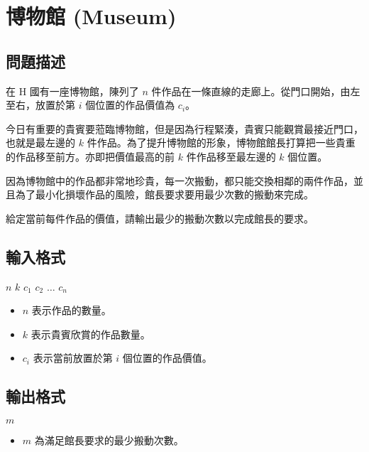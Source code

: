 \section{博物館 (Museum)}

\subsection{問題描述}

在 H 國有一座博物館，陳列了 \(n\)
件作品在一條直線的走廊上。從門口開始，由左至右，放置於第 \(i\)
個位置的作品價值為 \(c_i\)。

今日有重要的貴賓要蒞臨博物館，但是因為行程緊湊，貴賓只能觀賞最接近門口，也就是最左邊的
\(k\)
件作品。為了提升博物館的形象，博物館館長打算把一些貴重的作品移至前方。亦即把價值最高的前
\(k\) 件作品移至最左邊的 \(k\) 個位置。

因為博物館中的作品都非常地珍貴，每一次搬動，都只能交換相鄰的兩件作品，並且為了最小化損壞作品的風險，館長要求要用最少次數的搬動來完成。

給定當前每件作品的價值，請輸出最少的搬動次數以完成館長的要求。

\subsection{輸入格式}

\begin{format}
\f{
$n$ $k$
$c_1$ $c_2$ $\dots$ $c_n$
}
\end{format}

\begin{itemize}
\tightlist
\item
  \(n\) 表示作品的數量。
\item
  \(k\) 表示貴賓欣賞的作品數量。
\item
  \(c_i\) 表示當前放置於第 \(i\) 個位置的作品價值。
\end{itemize}

\subsection{輸出格式}

\begin{format}
\f{
$m$
}
\end{format}

\begin{itemize}
\tightlist
\item
  \(m\) 為滿足館長要求的最少搬動次數。
\end{itemize}

